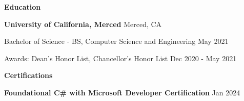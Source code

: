 \documentclass[11pt]{article}
\begin{document}
\begin{center}
    \textbf{Education}
\end{center}
\textbf{University of California, Merced} \hfill Merced, CA

Bachelor of Science - BS, Computer Science and Engineering \hfill May 2021

Awards: Dean's Honor List, Chancellor's Honor List \hfill Dec 2020 - May 2021

\vspace{12pt}

\begin{center}
    \textbf{Certifications}
\end{center}
\textbf{Foundational C\# with Microsoft Developer Certification} \hfill Jan 2024
\end{document}
